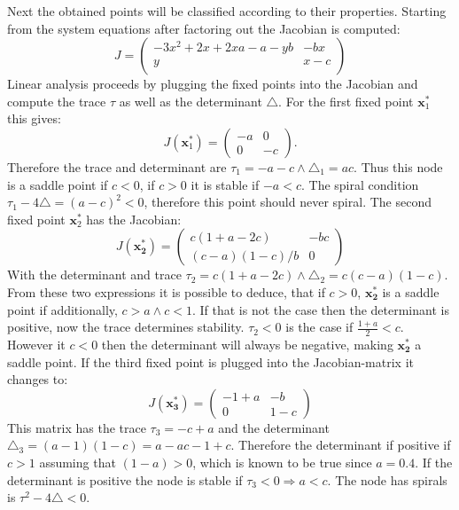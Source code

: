 Next the obtained points will be classified according to their properties. Starting from the system equations after factoring out the Jacobian is computed:
\begin{equation}
J = \begin{pmatrix}
-3x^2 + 2x + 2xa - a - yb & - bx \\
y & x-c \\
\end{pmatrix}
\end{equation}
Linear analysis proceeds by plugging the fixed points into the Jacobian and compute the trace $\tau$ as well as the determinant $\triangle$. For the first fixed point $\mathbf{x}_1^*$ this gives:
\begin{equation}
J(\mathbf{x}_1^*) = \begin{pmatrix}
-a & 0 \\
0  & -c \end{pmatrix}.
\label{eq:Jx1}
\end{equation}
Therefore the trace and determinant are $\tau_1 = -a-c \wedge \triangle_1 = ac$. Thus this node is a saddle point if $c < 0$, if $c > 0$ it is stable if $-a < c$. The spiral condition $\tau_1 - 4\triangle = (a-c)^2 < 0$, therefore this point should never spiral.
The second fixed point $\mathbf{x}_2^*$ has the Jacobian:
\begin{equation}
J(\mathbf{x_2^*}) = \begin{pmatrix}
c(1+a-2c) & - bc \\
(c-a)(1-c)/b &	0
\end{pmatrix}
\label{eq:Jx2}
\end{equation}
With the determinant and trace $\tau_2 = c(1+a-2c) \wedge \triangle_2 = c(c-a)(1-c)$. From these two expressions it is possible to deduce, that if $c>0$, $\mathbf{x_2^*}$ is a saddle point if additionally, $c > a \wedge c < 1$. If that is not the case then the determinant is positive, now the trace determines stability. $\tau_2 < 0$ is the case if $\frac{1+a}{2} < c$. However it $c < 0$ then the determinant will always be negative, making $\mathbf{x_2^*}$ a saddle point.
If the third fixed point is plugged into the Jacobian-matrix it changes to:
\begin{equation}
J(\mathbf{x_3^*}) = \begin{pmatrix}
-1 + a & -b \\
0 & 1-c 
\end{pmatrix}
\label{eq:Jx3}
\end{equation}
This matrix has the trace $\tau_3 = -c + a$ and the determinant $\triangle_3 = (a - 1)(1 - c) = a - ac -1 +c.$ Therefore the determinant if positive if $c > 1$ assuming that $(1-a) > 0$, which is known to be true since $a = 0.4$. If the determinant is positive the node is stable if $\tau_3 < 0 \Rightarrow a < c.$ The node has spirals is $\tau^2 - 4\triangle < 0$.
